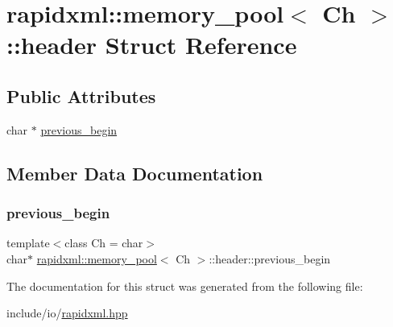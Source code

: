 \hypertarget{structrapidxml_1_1memory__pool_1_1header}{}\section{rapidxml\+::memory\+\_\+pool$<$ Ch $>$\+::header Struct Reference}
\label{structrapidxml_1_1memory__pool_1_1header}
\subsection*{Public Attributes}
\begin{DoxyCompactItemize}
\item 
char $\ast$ \mbox{\hyperlink{structrapidxml_1_1memory__pool_1_1header_a3035f6741bb38f91c7f2efd05398c23d}{previous\+\_\+begin}}
\end{DoxyCompactItemize}


\subsection{Member Data Documentation}
\mbox{\label{structrapidxml_1_1memory__pool_1_1header_a3035f6741bb38f91c7f2efd05398c23d}} 
\subsubsection{\texorpdfstring{previous\_begin}{previous\_begin}}
{\footnotesize\ttfamily template$<$class Ch  = char$>$ \\
char$\ast$ \mbox{\hyperlink{classrapidxml_1_1memory__pool}{rapidxml\+::memory\+\_\+pool}}$<$ Ch $>$\+::header\+::previous\+\_\+begin}



The documentation for this struct was generated from the following file\+:\begin{DoxyCompactItemize}
\item 
include/io/\mbox{\hyperlink{rapidxml_8hpp}{rapidxml.\+hpp}}\end{DoxyCompactItemize}
